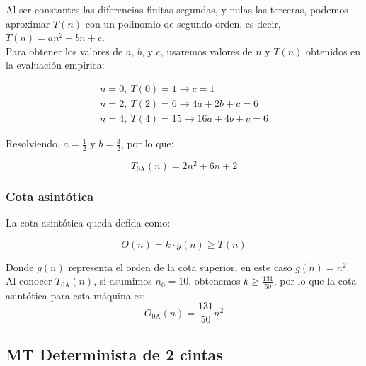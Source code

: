 Al ser constantes las diferencias finitas segundas, y nulas las terceras, podemos aproximar $T(n)$ con un polinomio de segundo orden, es decir, $T(n) = an^2 + bn + c$.\\

Para obtener los valores de $a$, $b$, y $c$, usaremos valores de $n$ y $T(n)$ obtenidos en la evaluación empírica:

\begin{subequations}
    \begin{gather}
        n = 0,\ T(0) = 1 \rightarrow c = 1 \\
        n = 2,\ T(2) = 6 \rightarrow 4a + 2b + c = 6 \\
        n = 4,\ T(4) = 15 \rightarrow 16a + 4b + c = 6
    \end{gather}
\end{subequations}

Resolviendo, $a=\frac{1}{2}$ y $b=\frac{3}{2}$, por lo que:

\begin{equation}
    T_{\mathrm{0A}}(n) = 2n^2 + 6n + 2
\end{equation}


\subsubsection*{Cota asintótica}
La cota asintótica queda defida como:

\begin{equation}
    O(n) = k \cdot g(n) \geq T(n)
    \label{eq:On}
\end{equation}

Donde $g(n)$ representa el orden de la cota superior, en este caso $g(n) = n^2$.\\

Al conocer $T_{\mathrm{0A}}(n)$, si asumimos $n_0 = 10$, obtenemos $k \geq \frac{131}{50}$, por lo que la cota asintótica para esta máquina es:
\begin{equation}
    O_{\mathrm{0A}}(n) = \frac{131}{50} n^2
\end{equation}





\subsection{MT Determinista de 2 cintas}

